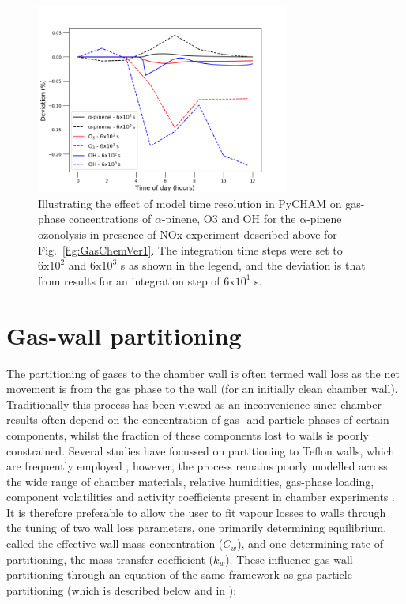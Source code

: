 \documentclass[gmd, manuscript]{copernicus}
\begin{document}
\begin{figure}[t]
\includegraphics[width=8.3cm]{Results/photo_chem_time_res.png}
\caption{Illustrating the effect of model time resolution in PyCHAM on gas-phase concentrations of $\alpha$-pinene, O3 and OH for the $\mathrm{\alpha}$-pinene ozonolysis in presence of NOx experiment described above for Fig.~\ref{fig:GasChemVer1}.  The integration time steps were set to $\mathrm{6x10^2}$ and $\mathrm{6x10^3}$ s as shown in the legend, and the deviation is that from results for an integration step of $\mathrm{6x10^1}$ s.}
\label{fig:GasChemTimeRes}
\end{figure}

\section{Gas-wall partitioning}\label{sec:wallpart}

The partitioning of gases to the chamber wall is often termed wall loss as the net movement is from the gas phase to the wall (for an initially clean chamber wall).  Traditionally this process has been viewed as an inconvenience since chamber results often depend on the concentration of gas- and particle-phases of certain components, whilst the fraction of these components lost to walls is poorly constrained.  Several studies have focussed on partitioning to Teflon walls, which are frequently employed \citep{Matsunaga2010, Zhang2015b, Zhao2018}, however, the process remains poorly modelled across the wide range of chamber materials, relative humidities, gas-phase loading, component volatilities and activity coefficients present in chamber experiments \citep[e.g.][]{Day2017, Stefenelli2018}.  It is therefore preferable to allow the user to fit vapour losses to walls through the tuning of two wall loss parameters, one primarily determining equilibrium, called the effective wall mass concentration ($C_w$), and one determining rate of partitioning, the mass transfer coefficient ($k_w$).  These influence gas-wall partitioning through an equation of the same framework as gas-particle partitioning (which is described below and in \citet{Zaveri2008}):
\end{document}
